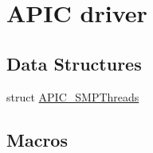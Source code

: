 \hypertarget{group__apic__driver}{}\section{A\+P\+IC driver}
\label{group__apic__driver}
\subsection*{Data Structures}
\begin{DoxyCompactItemize}
\item 
struct \hyperlink{structAPIC__SMPThreads}{A\+P\+I\+C\+\_\+\+S\+M\+P\+Threads}
\end{DoxyCompactItemize}
\subsection*{Macros}
